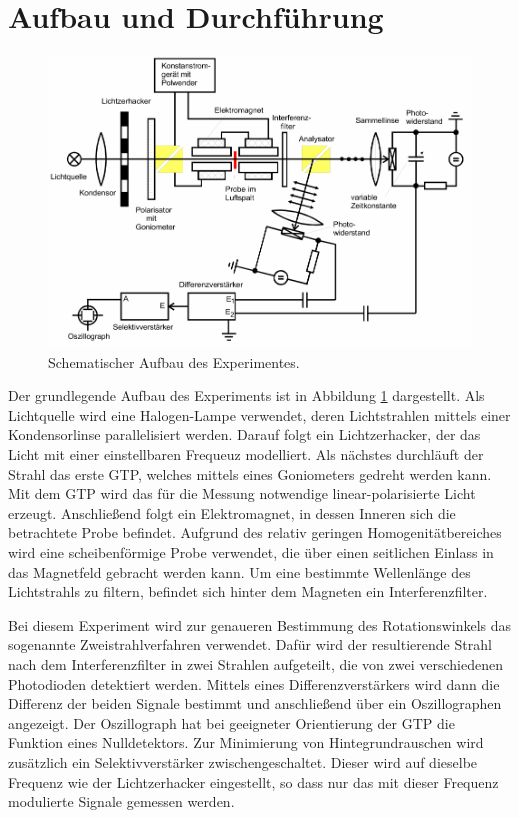 \newpage
\section{Aufbau und Durchführung}

\begin{figure}
  \centering
  \includegraphics[width = \textwidth]{Pics/Aufbau.pdf}
  \caption{Schematischer Aufbau des Experimentes\cite{Anleitung}.}
  \label{fig:Aufbau}
\end{figure}

Der grundlegende Aufbau des Experiments ist in Abbildung \ref{fig:Aufbau}
dargestellt. Als Lichtquelle wird eine Halogen-Lampe verwendet, deren Lichtstrahlen
mittels einer Kondensorlinse parallelisiert werden. Darauf folgt ein Lichtzerhacker,
der das Licht mit einer einstellbaren Frequeuz modelliert. Als nächstes durchläuft
der Strahl das erste GTP, welches mittels eines Goniometers gedreht werden kann.
Mit dem GTP wird das für die Messung notwendige linear-polarisierte Licht erzeugt.
Anschließend folgt ein Elektromagnet, in dessen Inneren sich die betrachtete
Probe befindet. Aufgrund des relativ geringen Homogenitätbereiches wird eine
scheibenförmige Probe verwendet, die über einen seitlichen Einlass in das
Magnetfeld gebracht werden kann. Um eine bestimmte Wellenlänge des Lichtstrahls
zu filtern, befindet sich hinter dem Magneten ein Interferenzfilter.

Bei diesem Experiment wird zur genaueren Bestimmung des Rotationswinkels das
sogenannte Zweistrahlverfahren verwendet. Dafür wird der resultierende Strahl
nach dem Interferenzfilter in zwei Strahlen aufgeteilt, die von zwei verschiedenen
Photodioden detektiert werden. Mittels eines Differenzverstärkers wird dann die
Differenz der beiden Signale bestimmt und anschließend über ein Oszillographen
angezeigt. Der Oszillograph hat bei geeigneter Orientierung der GTP die Funktion
eines Nulldetektors. Zur Minimierung von Hintegrundrauschen wird zusätzlich ein Selektivverstärker
zwischengeschaltet. Dieser wird auf dieselbe Frequenz wie der Lichtzerhacker
eingestellt, so dass nur das mit dieser Frequenz modulierte Signale gemessen werden.

